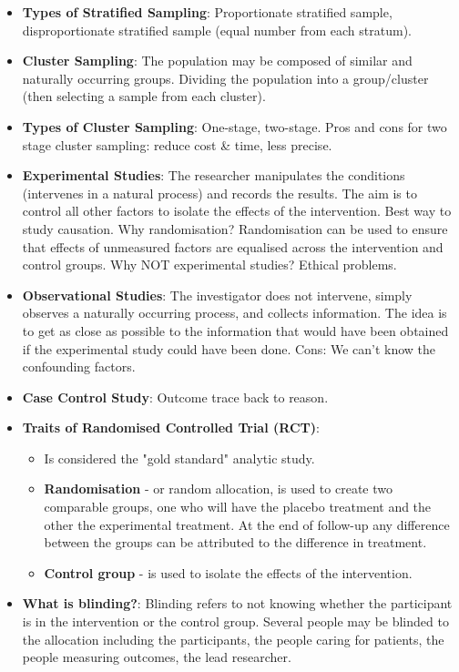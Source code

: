 \documentclass[12pt]{article}
\begin{document}
\begin{itemize}
\item \textbf{Types of Stratified Sampling}: Proportionate stratified sample, disproportionate stratified sample (equal number from each stratum).
\item \textbf{Cluster Sampling}: The population may be composed of similar and naturally occurring groups. Dividing the population into a group/cluster (then selecting a sample from each cluster).
\item \textbf{Types of Cluster Sampling}: One-stage, two-stage. Pros and cons for two stage cluster sampling: reduce cost \& time, less precise.
\item \textbf{Experimental Studies}: The researcher manipulates the conditions (intervenes in a natural process) and records the results. The aim is to control all other factors to isolate the effects of the intervention. Best way to study causation. Why randomisation? Randomisation can be used to ensure that effects of unmeasured factors are equalised across the intervention and control groups. Why NOT experimental studies? Ethical problems.
\item \textbf{Observational Studies}: The investigator does not intervene, simply observes a naturally occurring process, and collects information. The idea is to get as close as possible to the information that would have been obtained if the experimental study could have been done. Cons: We can't know the confounding factors.
\item \textbf{Case Control Study}: Outcome trace back to reason.
\item \textbf{Traits of Randomised Controlled Trial (RCT)}: 
	\begin{itemize}
	\item Is considered the "gold standard" analytic study.
	\item \textbf{Randomisation} - or random allocation, is used to create two comparable groups, one who will have the placebo treatment and the other the experimental treatment. At the end of follow-up any difference between the groups can be attributed to the difference in treatment.
	\item \textbf{Control group} - is used to isolate the effects of the intervention.
	\end{itemize}
\item \textbf{What is blinding?}: Blinding refers to not knowing whether the participant is in the intervention or the control group. Several people may be blinded to the allocation including the participants, the people caring for patients, the people measuring outcomes, the lead researcher.

\end{itemize}
\end{document}
